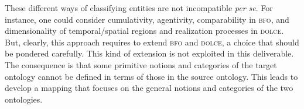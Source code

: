 \documentclass[ao]{iosart2x}
\newcommand{\bflist}{\begin{list}{}{\setlength{\topsep}{2mm}\setlength{\parsep}{0mm}\setlength{\leftmargin}{9.2mm}\setlength{\labelwidth}{8mm}}}
\newcommand{\bfoAxLabel}{\textrm{a$_\texttt{b}$}}
\newcommand{\bfoThrLabel}{\textrm{t$_\texttt{b}$}}
\newcommand{\dbAxLabel}{\textrm{a}$_\texttt{db}$}
\newcommand{\refbfoax}[1]{({\bfoAxLabel}\ref{#1})}
\newcommand{\refbfoth}[1]{({\bfoThrLabel}\ref{#1})}
\newcommand{\refdbax}[1]{({\dbAxLabel}\ref{#1})}
\newcommand{\dolce}{{\textsc{dolce}}}
\newcommand{\bfo}{{\textsc{bfo}}}
\newcommand {\thbfo} {\ensuremath{\mathfrak{B}}}
\newcommand{\bfoiof}[1]{{\,::_{#1\:\!}}}
\begin{document}
\smallskip
These different ways of classifying entities are not incompatible \textit{per se}. For instance, one could consider cumulativity, agentivity, comparability in {\bfo}, and dimensionality of temporal/spatial regions and realization processes in {\dolce}. But, clearly, this approach requires to extend {\bfo} and {\dolce}, a choice that should be pondered carefully. This kind of extension is not exploited in this deliverable. The consequence is that some primitive notions and categories of the target ontology cannot be defined in terms of those in the source ontology. This leads to develop a mapping that focuses on the general notions and categories of the two ontologies.
   





%


%
%
%
%




\end{document}
